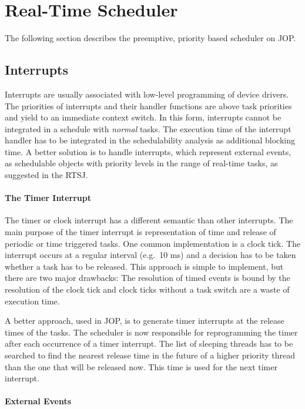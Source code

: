 \section{Real-Time Scheduler}

The following section describes the preemptive, priority based
scheduler on JOP.

\subsection{Interrupts}

Interrupts are usually associated with low-level programming of
device drivers. The priorities of interrupts and their handler
functions are above task priorities and yield to an immediate context
switch. In this form, interrupts cannot be integrated in a schedule
with \emph{normal} tasks. The execution time of the interrupt handler
has to be integrated in the schedulability analysis as additional
blocking time. A better solution is to handle interrupts, which
represent external events, as schedulable objects with priority
levels in the range of real-time tasks, as suggested in the RTSJ.

\paragraph{The Timer Interrupt}

The timer or clock interrupt has a different semantic than other
interrupts. The main purpose of the timer interrupt is representation
of time and release of periodic or time triggered tasks. One common
implementation is a clock tick. The interrupt occurs at a regular
interval (e.g.\ 10 ms) and a decision has to be taken whether a task
has to be released. This approach is simple to implement, but there
are two major drawbacks: The resolution of timed events is bound by
the resolution of the clock tick and clock ticks without a task
switch are a waste of execution time.

A better approach, used in JOP, is to generate timer interrupts at
the release times of the tasks. The scheduler is now responsible for
reprogramming the timer after each occurrence of a timer interrupt.
The list of sleeping threads has to be searched to find the nearest
release time in the future of a higher priority thread than the one
that will be released now. This time is used for the next timer
interrupt.

\paragraph{External Events}

